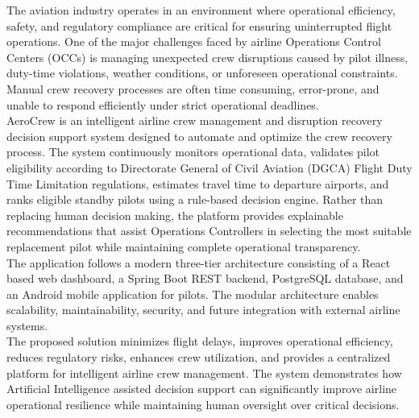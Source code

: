 \documentclass[12pt,a4paper]{report}
\begin{document}
The aviation industry operates in an environment where operational efficiency, safety, and regulatory compliance are critical for ensuring uninterrupted flight operations. One of the major challenges faced by airline Operations Control Centers (OCCs) is managing unexpected crew disruptions caused by pilot illness, duty-time violations, weather conditions, or unforeseen operational constraints. Manual crew recovery processes are often time consuming, error-prone, and unable to respond efficiently under strict operational deadlines. \\
AeroCrew is an intelligent airline crew management and disruption recovery decision support system designed to automate and optimize the crew recovery process. The system continuously monitors operational data, validates pilot eligibility according to Directorate General of Civil Aviation (DGCA) Flight Duty Time Limitation regulations, estimates travel time to departure airports, and ranks eligible standby pilots using a rule-based decision engine. Rather than replacing human decision making, the platform provides explainable recommendations that assist Operations Controllers in selecting the most suitable replacement pilot while maintaining complete operational transparency.\\
The application follows a modern three-tier architecture consisting of a React based web dashboard, a Spring Boot REST backend, PostgreSQL database, and an Android mobile application for pilots. The modular architecture enables scalability, maintainability, security, and future integration with external airline systems. \\
The proposed solution minimizes flight delays, improves operational efficiency, reduces regulatory risks, enhances crew utilization, and provides a centralized platform for intelligent airline crew management. The system demonstrates how Artificial Intelligence assisted decision support can significantly improve airline operational resilience while maintaining human oversight over critical decisions.



\newpage


\thispagestyle{empty}
\tableofcontents
\clearpage

\thispagestyle{empty}
\listoffigures
\clearpage

\thispagestyle{empty}
\listoftables
\clearpage
\end{document}
